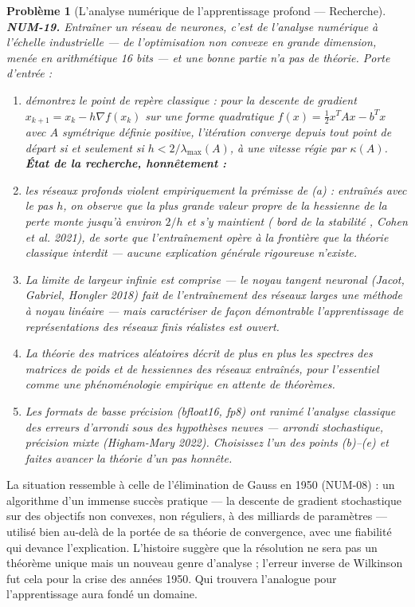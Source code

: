 \documentclass[11pt]{article}
\newtheorem{problem}{Problème}
\begin{document}
\begin{problem}[{L'analyse numérique de l'apprentissage profond --- Recherche}]
\textbf{NUM-19.} Entraîner un réseau de neurones, c'est de l'analyse
numérique à l'échelle industrielle --- de l'optimisation non convexe en grande dimension,
menée en arithmétique 16 bits --- et une bonne partie n'a pas de théorie. Porte
d'entrée :
\begin{enumerate}
\item[(a)] démontrez le
point de repère classique : pour la descente de gradient $x_{k+1} = x_k - h\nabla f(x_k)$
sur une forme quadratique $f(x) = \tfrac12 x^T A x - b^T x$ avec $A$ symétrique
définie positive, l'itération converge depuis tout point de départ si et seulement si
$h < 2/\lambda_{\max}(A)$, à une vitesse régie par
$\kappa(A)$. \textbf{État de la recherche, honnêtement :}
\item[(b)] les réseaux profonds
violent empiriquement la prémisse de (a) : entraînés avec le pas $h$, on observe que
la plus grande valeur propre de la hessienne de la perte monte jusqu'à environ $2/h$
et s'y maintient (\og{} bord de la stabilité \fg{}, Cohen et al. 2021), de sorte que
l'entraînement opère à la frontière que la théorie classique interdit --- aucune
explication générale rigoureuse n'existe.
\item[(c)] La
limite de largeur infinie est comprise --- le noyau tangent neuronal (Jacot, Gabriel,
Hongler 2018) fait de l'entraînement des réseaux larges une méthode à noyau linéaire ---
mais caractériser de façon démontrable l'apprentissage de représentations des réseaux
finis réalistes est ouvert.
\item[(d)] La théorie des matrices aléatoires décrit de plus en plus les spectres des matrices
de poids et de hessiennes des réseaux entraînés, pour l'essentiel comme une
phénoménologie empirique en attente de théorèmes.
\item[(e)] Les formats de basse précision (bfloat16, fp8) ont ranimé l'analyse classique des
erreurs d'arrondi sous des hypothèses neuves --- arrondi stochastique, précision mixte
(Higham-Mary 2022). Choisissez l'un des points (b)--(e) et faites avancer la théorie d'un
pas honnête.
\end{enumerate}

\end{problem}

\noindent La situation ressemble à celle de l'élimination de Gauss en 1950
(NUM-08) : un algorithme d'un immense succès pratique --- la descente de gradient
stochastique sur des objectifs non convexes, non réguliers, à des milliards de
paramètres --- utilisé bien au-delà de la portée de sa théorie de convergence, avec une
fiabilité qui devance l'explication. L'histoire suggère que la résolution ne sera pas un
théorème unique mais un nouveau genre d'analyse ; l'erreur inverse de Wilkinson fut cela
pour la crise des années 1950. Qui trouvera l'analogue pour l'apprentissage aura fondé
un domaine.
\end{document}
